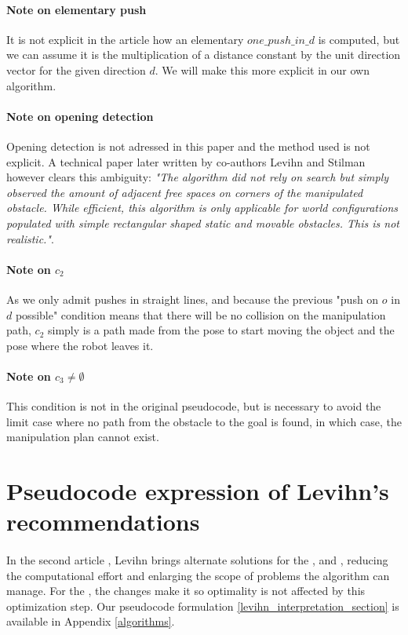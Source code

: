 \paragraph{Note on elementary push}\label{push_in_d_note} It is not explicit in the article how an elementary $one\_push\_in\_d$ is computed, but we can assume it is the multiplication of a distance constant by the unit direction vector for the given direction $d$. We will make this more explicit in our own algorithm.

\paragraph{Note on opening detection}\label{opening_detection_note} Opening detection is not adressed in this paper and the method used is not explicit. A technical paper later written by co-authors Levihn and Stilman \parencite{levihn_efficient_2011} however clears this ambiguity: \textit{"The algorithm did not rely on search but simply observed the amount of adjacent free spaces on corners of the manipulated obstacle. While efficient, this algorithm is only applicable for world configurations populated with simple rectangular shaped static and movable obstacles. This is not realistic."}.

\paragraph{Note on $c_{2}$}\label{c2_note} As we only admit pushes in straight lines, and because the previous "push on $o$ in $d$ possible" condition means that there will be no collision on the manipulation path, $c_{2}$ simply is a path made from the pose to start moving the object and the pose where the robot leaves it.

\paragraph{Note on $c_{3} \neq \emptyset$}\label{c3_note} This condition is not in the original pseudocode, but is necessary to avoid the limit case where no path from the obstacle to the goal is found, in which case, the manipulation plan cannot exist.

\section{Pseudocode expression of Levihn's recommendations}

\paragraph{} In the second article \parencite{levihn_locally_2014}, Levihn brings alternate solutions for the ,  and , reducing the computational effort and enlarging the scope of problems the algorithm can manage. For the , the changes make it so optimality is not affected by this optimization step. Our pseudocode formulation \ref{levihn_interpretation_section} is available in Appendix \ref{algorithms}.

